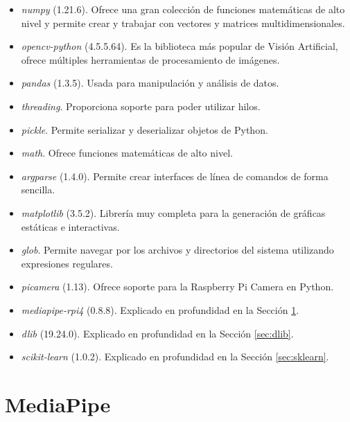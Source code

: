 \begin{itemize}
    \item \textit{numpy} (1.21.6). Ofrece una gran colección de funciones matemáticas de alto nivel y permite crear y trabajar con vectores y matrices multidimensionales.
    
    \item \textit{opencv-python} (4.5.5.64). Es la biblioteca más popular de Visión Artificial, ofrece múltiples herramientas de procesamiento de imágenes.
    
    \item \textit{pandas} (1.3.5). Usada para manipulación y análisis de datos.
    
    \item \textit{threading}. Proporciona soporte para poder utilizar hilos.
    
    \item \textit{pickle}. Permite serializar y deserializar objetos de Python.
    
    \item \textit{math}. Ofrece funciones matemáticas de alto nivel.
    
    \item \textit{argparse} (1.4.0). Permite crear interfaces de línea de comandos de forma sencilla.
    
    \item \textit{matplotlib} (3.5.2). Librería muy completa para la generación de gráficas estáticas e interactivas.
    
    \item \textit{glob}. Permite navegar por los archivos y directorios del sistema utilizando expresiones regulares.
    
    \item \textit{picamera} (1.13). Ofrece soporte para la Raspberry Pi Camera en Python.
    
    \item \textit{mediapipe-rpi4} (0.8.8). Explicado en profundidad en la Sección \ref{sec:mediapipe}.
    
    \item \textit{dlib} (19.24.0). Explicado en profundidad en la Sección \ref{sec:dlib}.
    
    \item \textit{scikit-learn} (1.0.2). Explicado en profundidad en la Sección \ref{sec:sklearn}.
\end{itemize}

\section{MediaPipe}
\label{sec:mediapipe}

